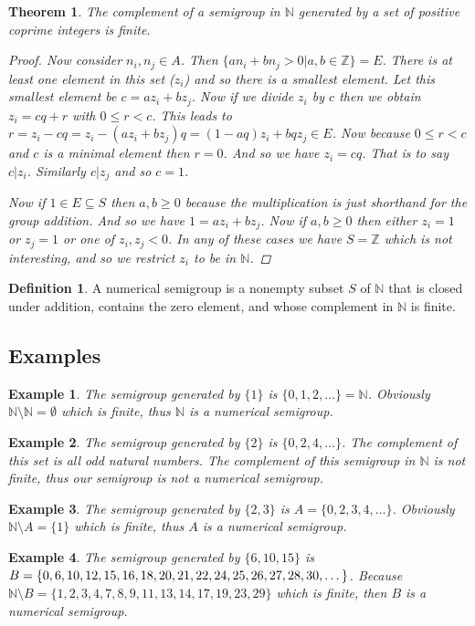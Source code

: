 \documentclass[11pt]{amsart}
\theoremstyle{plain}
\newtheorem{thm}{Theorem}
\newtheorem{exa}{Example}
\theoremstyle{definition}
\newtheorem{defi}{Definition}
\begin{document}
\begin{thm}
The complement of a semigroup in $\mathbb{N}$ generated by a set of positive
coprime integers is finite.
\begin{proof}
Now consider $n_i,n_j\in A$. Then $\{an_i+bn_j>0|a,b\in \mathbb{Z}\}=E$.
There is at least one element in this set ($z_i$) and so there is a smallest element. Let this smallest element be $c=az_i+bz_j$.
Now if we divide $z_i$ by $c$ then we obtain $z_i=cq+r$ with $0\le r<c$.
This leads to $r=z_i-cq=z_i-(az_i+bz_j)q=(1-aq)z_i+bqz_j\in E$. Now because $0\le r<c$ and $c$ is a minimal element then $r=0$. And so we have $z_i=cq$.
That is to say $c|z_i$. Similarly $c|z_j$ and so $c=1$.

Now if $1\in E\subseteq S$ then $a,b\ge0$ because the multiplication is just shorthand for the group addition. And so we have $1=az_i+bz_j$.
Now if $a,b\ge 0$ then either $z_i=1$ or $z_j=1$ or one of $z_i,z_j<0$. In any of these cases we have $S=\mathbb{Z}$ which is not interesting, and so we restrict $z_i$ to be in $\mathbb{N}$.
\end{proof}
\end{thm}
\begin{defi}\cite{rosales}
  A numerical semigroup is a nonempty subset $S$ of $\mathbb{N}$ that is closed
under addition, contains the zero element, and whose complement in $\mathbb{N}$
is finite.
\end{defi}

\subsection{Examples}
\begin{exa}
  The semigroup generated by $\{1\}$ is $\{0,1,2,\dots \}=\mathbb{N}$. Obviously
  $\mathbb{N}\setminus \mathbb{N}=\emptyset$ which is finite, thus $\mathbb{N}$
  is a numerical semigroup.
\end{exa}
\begin{exa}
  The semigroup generated by $\{2\}$ is $\{0,2,4,\dots \}$. The complement of
  this set is all odd natural numbers. The complement of this semigroup in
  $\mathbb{N}$ is not finite, thus our semigroup is not a numerical semigroup.
\end{exa}
\begin{exa}
  The semigroup generated by $\{2,3\}$ is $A=\{0,2,3,4,\dots \}$. Obviously
  $\mathbb{N}\setminus A=\{1\}$ which is finite, thus $A$ is a numerical
  semigroup.
\end{exa}
\begin{exa}
  The semigroup generated by $\{6,10,15\}$ is $B=\{0, 6, 10, 12, 15, 16, 18,
  20, 21, 22,\\ 24, 25, 26, 27, 28, 30, \dots \}$. Because $\mathbb{N}\setminus
  B=\{1,2,3,4,7,8,9,11,13,
  14,17,19,23,29\}$ which is finite, then $B$ is a numerical semigroup.
\end{exa}
\end{document}
